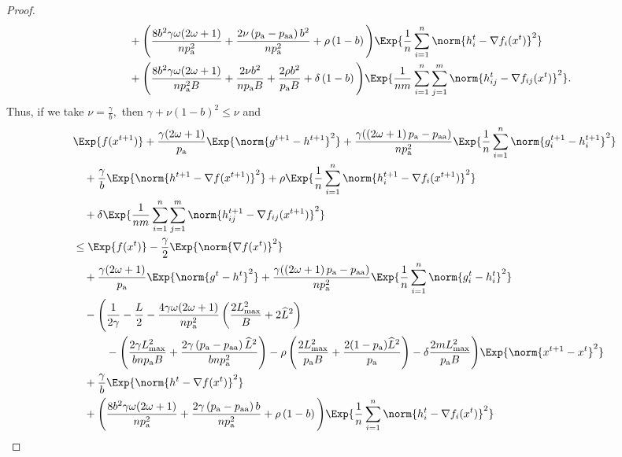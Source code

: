 \documentclass{article}
\newcommand*{\probavailable}{\ensuremath{p_{\textnormal{a}}}}
\newcommand*{\probpairaa}{\ensuremath{p_{\textnormal{aa}}}}
\begin{document}
\begin{proof}
\begin{align*}
      &\quad + \Bigg(\frac{8 b^2 \gamma \omega (2 \omega + 1)}{n \probavailable^2} + \frac{2 \nu \left(\probavailable - \probpairaa\right) b^2}{n \probavailable^2} + \rho \left(1 - b\right)\Bigg)\Exp{\frac{1}{n}\sum_{i=1}^n\norm{h^{t}_i - \nabla f_i(x^{t})}^2} \\
      &\quad + \Bigg(\frac{8 b^2 \gamma \omega (2 \omega + 1)}{n \probavailable^2 B} + \frac{2 \nu b^2}{n \probavailable B} + \frac{2 \rho b^2}{\probavailable B} + \delta \left(1 - b\right)\Bigg)\Exp{\frac{1}{nm}\sum_{i=1}^n\sum_{j=1}^m\norm{h^{t}_{ij} - \nabla f_{ij}(x^{t})}^2}.
    \end{align*}
    Thus, if we take $\nu = \frac{\gamma}{b},$ then $\gamma + \nu \left(1 - b\right)^2 \leq \nu$ and
    \begin{align*}
      &\Exp{f(x^{t + 1})} + \frac{\gamma (2 \omega + 1)}{\probavailable} \Exp{\norm{g^{t+1} - h^{t+1}}^2} + \frac{\gamma (\left(2 \omega + 1\right)\probavailable - \probpairaa)}{n \probavailable^2} \Exp{\frac{1}{n}\sum_{i=1}^n\norm{g^{t+1}_i - h^{t+1}_i}^2}\\
      &\quad  + \frac{\gamma}{b} \Exp{\norm{h^{t+1} - \nabla f(x^{t+1})}^2} + \rho \Exp{\frac{1}{n}\sum_{i=1}^n\norm{h^{t+1}_i - \nabla f_i(x^{t+1})}^2}\\
      &\quad + \delta \Exp{\frac{1}{nm}\sum_{i=1}^n\sum_{j=1}^m\norm{h^{t+1}_{ij} - \nabla f_{ij}(x^{t+1})}^2} \\
      &\leq \Exp{f(x^t)} - \frac{\gamma}{2}\Exp{\norm{\nabla f(x^t)}^2} \\
      &\quad + \frac{\gamma (2 \omega + 1)}{\probavailable} \Exp{\norm{g^{t} - h^{t}}^2} + \frac{\gamma (\left(2 \omega + 1\right)\probavailable - \probpairaa)}{n \probavailable^2} \Exp{\frac{1}{n}\sum_{i=1}^n\norm{g^{t}_i - h^{t}_i}^2} \\
      &\quad - \Bigg(\frac{1}{2\gamma} - \frac{L}{2} - \frac{4 \gamma \omega (2 \omega + 1)}{n \probavailable^2} \left(\frac{2 L_{\max}^2}{B} + 2 \widehat{L}^2\right) \\
      &\qquad\quad - \left(\frac{2 \gamma L_{\max}^2}{b n \probavailable B} + \frac{2 \gamma \left(\probavailable - \probpairaa\right) \widehat{L}^2}{b n \probavailable^2}\right) - \rho \left(\frac{2 L_{\max}^2}{\probavailable B} +\frac{2(1 - \probavailable) \widehat{L}^2}{\probavailable}\right) - \delta \frac{2 m L_{\max}^2}{\probavailable B} \Bigg) \Exp{\norm{x^{t+1} - x^t}^2} \\
      &\quad + \frac{\gamma}{b} \Exp{\norm{h^{t} - \nabla f(x^{t})}^2} \\
      &\quad + \Bigg(\frac{8 b^2 \gamma \omega (2 \omega + 1)}{n \probavailable^2} + \frac{2 \gamma \left(\probavailable - \probpairaa\right) b}{n \probavailable^2} + \rho \left(1 - b\right)\Bigg)\Exp{\frac{1}{n}\sum_{i=1}^n\norm{h^{t}_i - \nabla f_i(x^{t})}^2} \\

\end{align*}
\end{proof}
\end{document}
